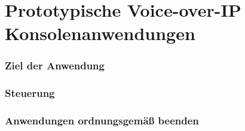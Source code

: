 \chapter{Prototypische Voice-over-IP Konsolenanwendungen}
\subsection{Ziel der Anwendung}
\subsection{Steuerung}
\subsection{Anwendungen ordnungsgemäß beenden}

